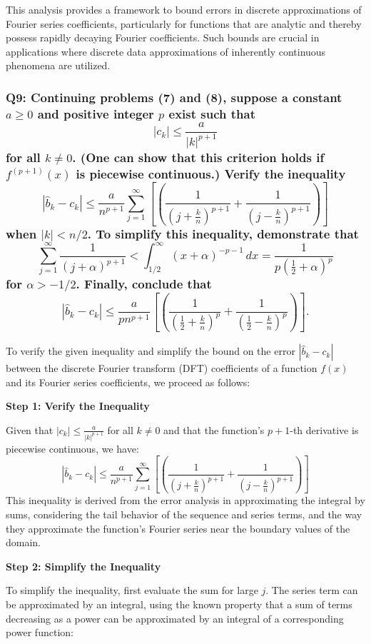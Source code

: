 \documentclass[8pt]{article}
\begin{document}
This analysis provides a framework to bound errors in discrete approximations of Fourier series coefficients, particularly for functions that are analytic and thereby possess rapidly decaying Fourier coefficients. Such bounds are crucial in applications where discrete data approximations of inherently continuous phenomena are utilized.

\subsubsection*{Q9:
Continuing problems (7) and (8), suppose a constant \(a \geq 0\) and positive integer \(p\) exist such that
\[
|c_k| \leq \frac{a}{|k|^{p+1}}
\]
for all \(k \neq 0\). (One can show that this criterion holds if \(f^{(p+1)}(x)\) is piecewise continuous.) Verify the inequality
\[
|\hat{b}_k - c_k| \leq \frac{a}{n^{p+1}} \sum_{j=1}^\infty \left[ \left( \frac{1}{\left( j + \frac{k}{n} \right)^{p+1}} + \frac{1}{\left( j - \frac{k}{n} \right)^{p+1}} \right) \right]
\]
when \(|k| < n/2\). To simplify this inequality, demonstrate that
\[
\sum_{j=1}^\infty \frac{1}{(j + \alpha)^{p+1}} < \int_{1/2}^\infty (x + \alpha)^{-p-1} \, dx = \frac{1}{p \left( \frac{1}{2} + \alpha \right)^p}
\]
for \(\alpha > -1/2\). Finally, conclude that
\[
|\hat{b}_k - c_k| \leq \frac{a}{pn^{p+1}} \left[ \left( \frac{1}{\left( \frac{1}{2} + \frac{k}{n} \right)^p} + \frac{1}{\left( \frac{1}{2} - \frac{k}{n} \right)^p} \right) \right].
\]}

To verify the given inequality and simplify the bound on the error \(|\hat{b}_k - c_k|\) between the discrete Fourier transform (DFT) coefficients of a function \(f(x)\) and its Fourier series coefficients, we proceed as follows:

\textbf{Step 1: Verify the Inequality}

Given that \(|c_k| \leq \frac{a}{|k|^{p+1}}\) for all \(k \neq 0\) and that the function's \(p+1\)-th derivative is piecewise continuous, we have:
\[ |\hat{b}_k - c_k| \leq \frac{a}{n^{p+1}} \sum_{j=1}^\infty \left[ \left( \frac{1}{\left( j + \frac{k}{n} \right)^{p+1}} + \frac{1}{\left( j - \frac{k}{n} \right)^{p+1}} \right) \right] \]
This inequality is derived from the error analysis in approximating the integral by sums, considering the tail behavior of the sequence and series terms, and the way they approximate the function's Fourier series near the boundary values of the domain.

\textbf{Step 2: Simplify the Inequality}

To simplify the inequality, first evaluate the sum for large \(j\). The series term can be approximated by an integral, using the known property that a sum of terms decreasing as a power can be approximated by an integral of a corresponding power function:
\end{document}
